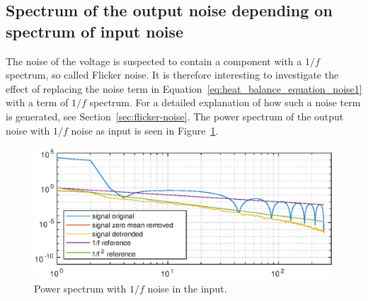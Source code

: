 \subsection{Spectrum of the output noise depending on spectrum of input noise}
The noise of the voltage is suspected to contain a component with a
$1/f$ spectrum, so called Flicker noise. It is therefore interesting
to investigate the effect of replacing the noise term in
Equation~\eqref{eq:heat_balance_equation_noise1} with a term of $1/f$
spectrum. For a detailed explanation of how such a noise term is
generated, see Section~\ref{sec:flicker-noise}. The power spectrum
of the output noise with $1/f$ noise as input is seen in
Figure~\ref{fig:power_spectrum_pink}.

\begin{figure}[H]
\includegraphics[scale=0.9]{gfx/spectrum_pink_noise.eps}
\caption{Power spectrum with $1/f$ noise in the input.}
\label{fig:power_spectrum_pink}
\end{figure}


